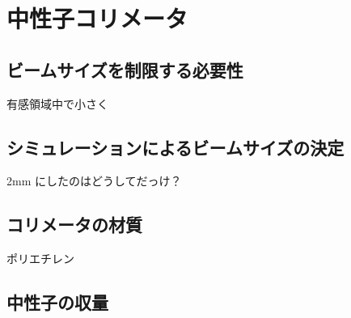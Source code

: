 \documentclass[../master]{subfiles}
\begin{document}
\chapter{中性子コリメータ}
\section{ビームサイズを制限する必要性}
有感領域中で小さく
\section{シミュレーションによるビームサイズの決定}
2mm にしたのはどうしてだっけ？
\section{コリメータの材質}
ポリエチレン
\section{中性子の収量}
\end{document}
